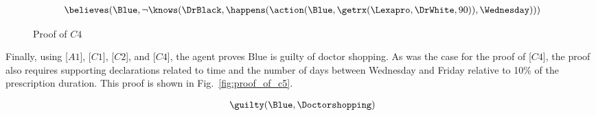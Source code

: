 \begin{footnotesize}
\begin{align*}
[C4] \ \believes(\Blue, \neg \knows(\DrBlack,\happens(\action(\Blue,\getrx(\Lexapro,\DrWhite,90)),\Wednesday)))
\end{align*}
\end{footnotesize}

\begin{figure}[h!] 
\vspace{6pt}
\centering
{}
\caption{Proof of $C4$}
\label{fig:proof_of_c4}
\end{figure}


\noindent Finally, using [$A1$], [$C1$], [$C2$], and [$C4$], the agent proves Blue is guilty of doctor shopping.  As was the case for the proof of [$C4$], the proof also requires supporting declarations related to time and the number of days between Wednesday and Friday relative to 10\% of the prescription duration.  This proof is shown in Fig.~\ref{fig:proof_of_c5}.
\begin{footnotesize}
\begin{align*}
[C5] \ \guilty(\Blue,\Doctorshopping)
\end{align*}
\end{footnotesize}


